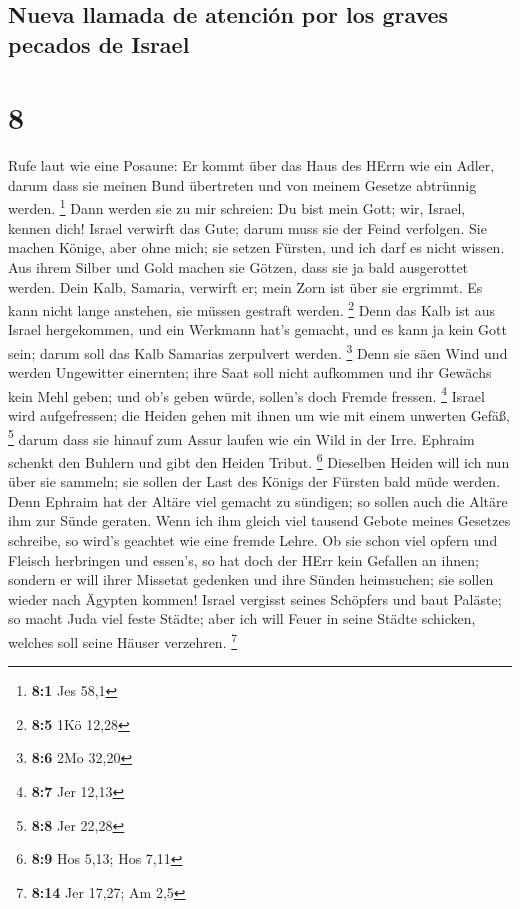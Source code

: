 \hypertarget{nueva-llamada-de-atenciuxf3n-por-los-graves-pecados-de-israel}{%
\subsection{Nueva llamada de atención por los graves pecados de
Israel}\label{nueva-llamada-de-atenciuxf3n-por-los-graves-pecados-de-israel}}

\hypertarget{section-7}{%
\section{8}\label{section-7}}

 Rufe laut wie eine Posaune: Er kommt über das Haus des
HErrn wie ein Adler, darum dass sie meinen Bund übertreten und von
meinem Gesetze abtrünnig werden. \footnote{\textbf{8:1} Jes 58,1}
 Dann werden sie zu mir schreien: Du bist mein Gott; wir,
Israel, kennen dich!  Israel verwirft das Gute; darum muss
sie der Feind verfolgen.  Sie machen Könige, aber ohne
mich; sie setzen Fürsten, und ich darf es nicht wissen. Aus ihrem Silber
und Gold machen sie Götzen, dass sie ja bald ausgerottet werden.
 Dein Kalb, Samaria, verwirft er; mein Zorn ist über sie
ergrimmt. Es kann nicht lange anstehen, sie müssen gestraft werden.
\footnote{\textbf{8:5} 1Kö 12,28}  Denn das Kalb ist aus
Israel hergekommen, und ein Werkmann hat's gemacht, und es kann ja kein
Gott sein; darum soll das Kalb Samarias zerpulvert werden. \footnote{\textbf{8:6}
  2Mo 32,20}  Denn sie säen Wind und werden Ungewitter
einernten; ihre Saat soll nicht aufkommen und ihr Gewächs kein Mehl
geben; und ob's geben würde, sollen's doch Fremde fressen. \footnote{\textbf{8:7}
  Jer 12,13}  Israel wird aufgefressen; die Heiden gehen
mit ihnen um wie mit einem unwerten Gefäß, \footnote{\textbf{8:8} Jer
  22,28}  darum dass sie hinauf zum Assur laufen wie ein
Wild in der Irre. Ephraim schenkt den Buhlern und gibt den Heiden
Tribut. \footnote{\textbf{8:9} Hos 5,13; Hos 7,11} 
Dieselben Heiden will ich nun über sie sammeln; sie sollen der Last des
Königs der Fürsten bald müde werden.  Denn Ephraim hat
der Altäre viel gemacht zu sündigen; so sollen auch die Altäre ihm zur
Sünde geraten.  Wenn ich ihm gleich viel tausend Gebote
meines Gesetzes schreibe, so wird's geachtet wie eine fremde Lehre.
 Ob sie schon viel opfern und Fleisch herbringen und
essen's, so hat doch der HErr kein Gefallen an ihnen; sondern er will
ihrer Missetat gedenken und ihre Sünden heimsuchen; sie sollen wieder
nach Ägypten kommen!  Israel vergisst seines Schöpfers
und baut Paläste; so macht Juda viel feste Städte; aber ich will Feuer
in seine Städte schicken, welches soll seine Häuser verzehren.
\footnote{\textbf{8:14} Jer 17,27; Am 2,5}

